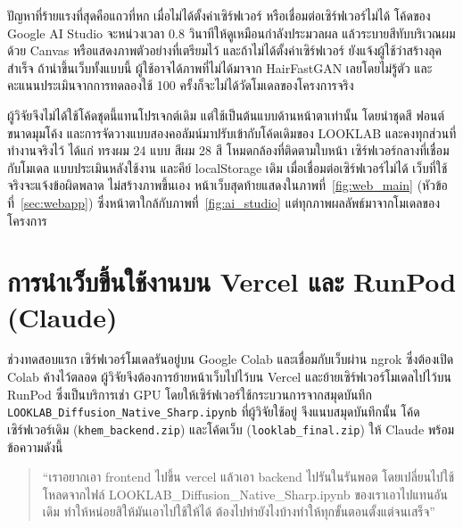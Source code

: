 ปัญหาที่ร้ายแรงที่สุดคือแถวที่หก เมื่อไม่ได้ตั้งค่าเซิร์ฟเวอร์ หรือเชื่อมต่อเซิร์ฟเวอร์ไม่ได้
โค้ดของ Google AI Studio จะหน่วงเวลา 0.8 วินาทีให้ดูเหมือนกำลังประมวลผล แล้วระบายสีทับบริเวณผมด้วย Canvas
หรือแสดงภาพตัวอย่างที่เตรียมไว้ และถ้าไม่ได้ตั้งค่าเซิร์ฟเวอร์ ยังแจ้งผู้ใช้ว่าสร้างลุคสำเร็จ
ถ้านำขึ้นเว็บทั้งแบบนี้ ผู้ใช้อาจได้ภาพที่ไม่ได้มาจาก HairFastGAN เลยโดยไม่รู้ตัว
และคะแนนประเมินจากการทดลองใช้ 100 ครั้งก็จะไม่ได้วัดโมเดลของโครงการจริง

ผู้วิจัยจึงไม่ได้ใช้โค้ดชุดนี้แทนโปรเจกต์เดิม แต่ใช้เป็นต้นแบบด้านหน้าตาเท่านั้น
โดยนำชุดสี ฟอนต์ ขนาดมุมโค้ง และการจัดวางแบบสองคอลัมน์มาปรับเข้ากับโค้ดเดิมของ LOOKLAB
และคงทุกส่วนที่ทำงานจริงไว้ ได้แก่ ทรงผม 24 แบบ สีผม 28 สี โหมดกล้องที่ติดตามใบหน้า เซิร์ฟเวอร์กลางที่เชื่อมกับโมเดล
แบบประเมินหลังใช้งาน และคีย์ localStorage เดิม
เมื่อเชื่อมต่อเซิร์ฟเวอร์ไม่ได้ เว็บที่ใช้จริงจะแจ้งข้อผิดพลาด ไม่สร้างภาพขึ้นเอง
หน้าเว็บสุดท้ายแสดงในภาพที่~\ref{fig:web_main} (หัวข้อที่~\ref{sec:webapp})
ซึ่งหน้าตาใกล้กับภาพที่~\ref{fig:ai_studio} แต่ทุกภาพผลลัพธ์มาจากโมเดลของโครงการ

\section{การนำเว็บขึ้นใช้งานบน Vercel และ RunPod \mbox{(Claude)}}
\label{sec:ai_deploy}

ช่วงทดสอบแรก เซิร์ฟเวอร์โมเดลรันอยู่บน Google Colab และเชื่อมกับเว็บผ่าน ngrok ซึ่งต้องเปิด Colab ค้างไว้ตลอด
ผู้วิจัยจึงต้องการย้ายหน้าเว็บไปไว้บน Vercel และย้ายเซิร์ฟเวอร์โมเดลไปไว้บน RunPod ซึ่งเป็นบริการเช่า GPU
โดยให้เซิร์ฟเวอร์ใช้กระบวนการจากสมุดบันทึก \texttt{LOOKLAB\_Diffusion\_\allowbreak Native\_Sharp.ipynb} ที่ผู้วิจัยใช้อยู่
จึงแนบสมุดบันทึกนั้น โค้ดเซิร์ฟเวอร์เดิม (\texttt{khem\_backend.zip}) และโค้ดเว็บ (\texttt{looklab\_final.zip}) ให้ Claude พร้อมข้อความดังนี้
\begin{quote}
\small ``เราอยากเอา frontend ไปขึ้น vercel แล้วเอา backend ไปรันในรันพอต
โดยเปลี่ยนไปใช้โหลดจากไฟล์ LOOKLAB\_Diffusion\_Native\_Sharp.ipynb ของเราเอาไปแทนอันเดิม
ทำให้หน่อยสิให้มันเอาไปใช้ให้ได้ ต้องไปทำยังไงบ้างทำให้ทุกขั้นตอนตั้งแต่จนเสร็จ''
\end{quote}

